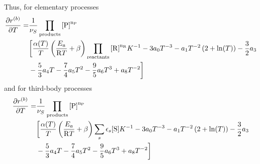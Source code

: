 Thus, for elementary processes
\begin{equation}
\begin{split}
\doverdT{\bkwdrate} = & \frac{1}{\scoef[S]} \prodProd \\
&\bigg[
        \frac{\kinMod}{\Temp} \left(\frac{E_a}{\Rg \Temp} + \beta\right)\prodReac \Eqconst^{-1}
                  - 3\tc{0}\Temp^{-3} - \tc{1} \Temp^{-2} \left(2 + \ln(\Temp)\right) - \frac{3}{2} \tc{3} \\
&                 - \frac{5}{3} \tc{4} \Temp - \frac{7}{4}\tc{5} \Temp^2 - \frac{9}{5}\tc{6} \Temp^3 + \tc{8} \Temp^{-2} \bigg]
\end{split}
\end{equation}
and for third-body processes
\begin{equation}
\begin{split}
\doverdT{\bkwdrate} = & \frac{1}{\scoef[S]} \prodProd \\
&\bigg[
        \frac{\kinMod}{\Temp} \left(\frac{E_a}{\Rg \Temp} + \beta\right) \threeBody \Eqconst^{-1} 
                  - 3\tc{0}\Temp^{-3} - \tc{1} \Temp^{-2} \left(2 + \ln(\Temp)\right) - \frac{3}{2} \tc{3} \\
&                 - \frac{5}{3} \tc{4} \Temp - \frac{7}{4}\tc{5} \Temp^2 - \frac{9}{5}\tc{6} \Temp^3 + \tc{8} \Temp^{-2} \bigg]
\end{split}
\end{equation}

